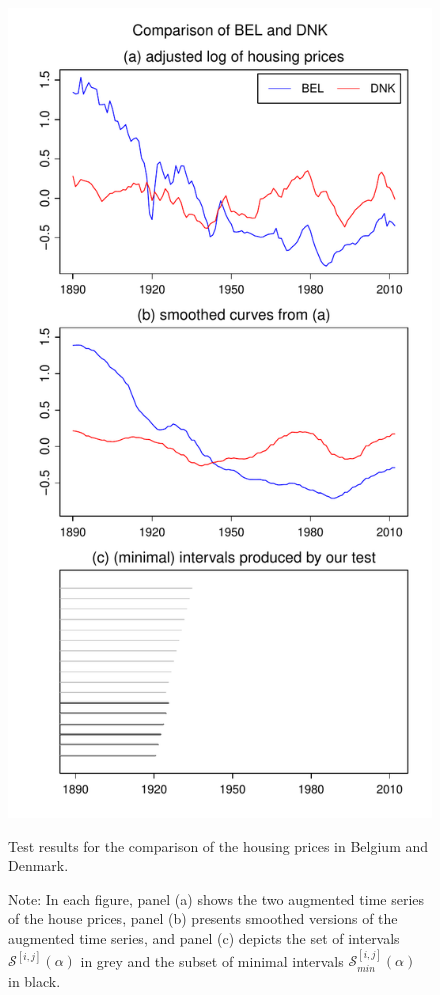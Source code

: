 \documentclass[a4paper,12pt]{article}
\begin{document}
\begin{figure}[b!]
\hspace{0.25cm}
\begin{minipage}[t]{0.49\textwidth}
\includegraphics[width=\textwidth]{Plots/hp/hp_BEL_vs_DNK}
\caption{Test results for the comparison of the housing prices in Belgium and Denmark.}\label{fig:hp:Belgium:Denmark}
\end{minipage}
\caption*{Note: In each figure, panel (a) shows the two augmented time series of the house prices, panel (b) presents smoothed versions of the augmented time series, and panel (c) depicts the set of intervals $\mathcal{S}^{[i, j]}(\alpha)$ in grey and the subset of minimal intervals $\mathcal{S}^{[i, j]}_{min}(\alpha)$ in black.}
\end{figure}
\end{document}
